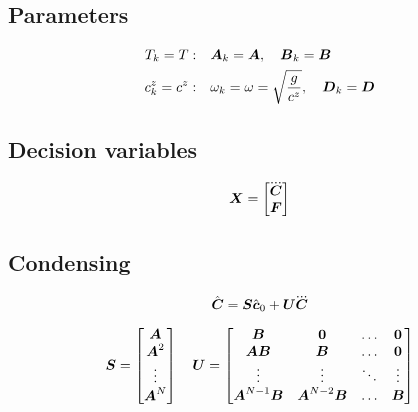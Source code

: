 \documentclass[12pt,a4paper]{article}
\begin{document}
\subsection{Parameters}
\begin{align*}
T_k = T:&
\quad
\mbox{\boldmath $A$}_k = \mbox{\boldmath $A$},
\quad
\mbox{\boldmath $B$}_k = \mbox{\boldmath $B$}\\
c^z_k = c^z:& 
\quad
\omega_k = \omega = \sqrt{\frac{g}{c^z}},
\quad
\mbox{\boldmath $D$}_k = \mbox{\boldmath $D$}
\end{align*}


\subsection{Decision variables}
\begin{equation*}
\V{X} = 
\begin{bmatrix} 
    \cJerk \\ 
    \FD
\end{bmatrix}
\end{equation*}


\subsection{Condensing}

\begin{equation*}
\cState = \M{S} \cstate_0     +   \M{U} \cJerk
\end{equation*}

\begin{equation*}
    \mbox{\boldmath $S$} =
        \begin{bmatrix}
        \mbox{\boldmath $A$} \\
        \mbox{\boldmath $A$}^2 \\
        \vdots \\
        \mbox{\boldmath $A$}^{N}\\
        \end{bmatrix}
    \quad
    \mbox{\boldmath $U$} =
        \begin{bmatrix}
        \mbox{\boldmath $B$}               & \mbox{\boldmath $0$}             & \dots & \mbox{\boldmath $0$} \\
        \mbox{\boldmath $A$}\mbox{\boldmath $B$}          & \mbox{\boldmath $B$}             & \dots & \mbox{\boldmath $0$} \\
        \vdots              & \vdots            & \ddots& \vdots \\
        \mbox{\boldmath $A$}^{N-1}\mbox{\boldmath $B$}    & \mbox{\boldmath $A$}^{N-2}\mbox{\boldmath $B$}  & \dots & \mbox{\boldmath $B$} \\
        \end{bmatrix}
\end{equation*}
\end{document}
